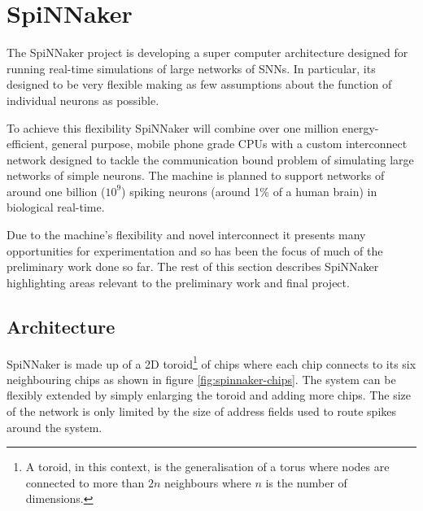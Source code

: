 	
	\section{SpiNNaker}
		
		\label{sec:spinnaker}
		
		
		The SpiNNaker project is developing a super computer architecture designed
		for running real-time simulations of large networks of SNNs. In particular,
		its designed to be very flexible making as few assumptions about the
		function of individual neurons as possible\cite{furber06}.
		
		To achieve this flexibility SpiNNaker will combine over one million
		energy-efficient, general purpose, mobile phone grade CPUs with a custom
		interconnect network designed to tackle the communication bound problem of
		simulating large networks of simple neurons. The machine is planned to
		support networks of around one billion ($10^9$) spiking neurons (around 1\%
		of a human brain) in biological real-time.
		
		Due to the machine's flexibility and novel interconnect it presents many
		opportunities for experimentation and so has been the focus of much of the
		preliminary work done so far. The rest of this section describes SpiNNaker
		highlighting areas relevant to the preliminary work and final project.
		
		\subsection{Architecture}
			
			
			SpiNNaker is made up of a 2D toroid\footnote{A toroid, in this context, is
			the generalisation of a torus where nodes are connected to more than $2n$
			neighbours where $n$ is the number of dimensions.} of chips where each
			chip connects to its six neighbouring chips as shown in figure
			\ref{fig:spinnaker-chips}. The system can be flexibly extended by simply
			enlarging the toroid and adding more chips. The size of the network is
			only limited by the size of address fields used to route spikes around the
			system.
			
